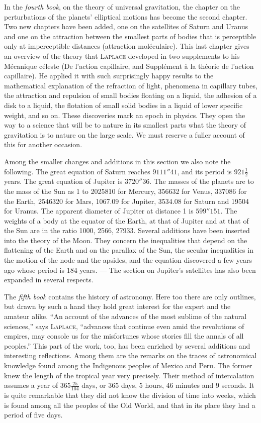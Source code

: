 In the \emph{fourth book}, on the theory of universal gravitation, the chapter on the perturbations of the planets’ elliptical motions has become the second chapter. Two new chapters have been added, one on the satellites of Saturn and Uranus and one on the attraction between the smallest parts of bodies that is perceptible only at imperceptible distances (attraction moléculaire). This last chapter gives an overview of the theory that \textsc{Laplace} developed in two supplements to his Mécanique céleste (De l'action capillaire, and Supplément à la théorie de l'action capillaire). He applied it with such surprisingly happy results to the mathematical explanation of the refraction of light, phenomena in capillary tubes, the attraction and repulsion of small bodies floating on a liquid, the adhesion of a disk to a liquid, the flotation of small solid bodies in a liquid of lower specific weight, and so on. These discoveries mark an epoch in physics. They open the way to a science that will be to nature in its smallest parts what the theory of gravitation is to nature on the large scale. We must reserve a fuller account of this for another occasion.

Among the smaller changes and additions in this section we also note the following. The great equation of Saturn reaches $9111''41$, and its period is $921\frac{1}{2}$ years. The great equation of Jupiter is $3720''36$. The masses of the planets are to the mass of the Sun as 1 to 2025810 for Mercury, 356632 for Venus, 337086 for the Earth, 2546320 for Mars, 1067.09 for Jupiter, 3534.08 for Saturn and 19504 for Uranus. The apparent diameter of Jupiter at distance 1 is $599''151$. The weights of a body at the equator of the Earth, at that of Jupiter and at that of the Sun are in the ratio 1000, 2566, 27933. Several additions have been inserted into the theory of the Moon. They concern the inequalities that depend on the flattening of the Earth and on the parallax of the Sun, the secular inequalities in the motion of the node and the apsides, and the equation discovered a few years ago whose period is 184 years. --- The section on Jupiter’s satellites has also been expanded in several respects.

The \emph{fifth book} contains the history of astronomy. Here too there are only outlines, but drawn by such a hand they hold great interest for the expert and the amateur alike. “An account of the advances of the most sublime of the natural sciences,” says \textsc{Laplace}, “advances that continue even amid the revolutions of empires, may console us for the misfortunes whose stories fill the annals of all peoples.” This part of the work, too, has been enriched by several additions and interesting reflections. Among them are the remarks on the traces of astronomical knowledge found among the Indigenous peoples of Mexico and Peru. The former knew the length of the tropical year very precisely. Their method of intercalation assumes a year of $365\frac{25}{104}$ days, or 365 days, 5 hours, 46 minutes and 9 seconds. It is quite remarkable that they did not know the division of time into weeks, which is found among all the peoples of the Old World, and that in its place they had a period of five days.

